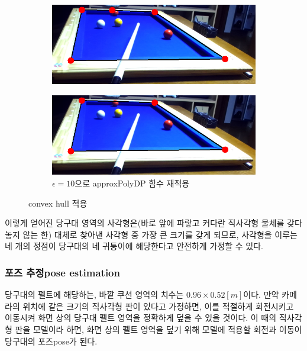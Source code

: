 \documentclass[10pt]{oblivoir}
\newcommand{\textss}[1]{\scriptsize#1\normalsize}
\begin{document}
\begin{figure}[ht]
    \centering
    \begin{subfigure}{8cm}
        \includegraphics[width=\textwidth]{img/billiards-table-low-angle-convex.png}
        \caption{}
        \label{fig;table-lowangle-convexhull-src}
    \end{subfigure}
    \begin{subfigure}{8cm}
        \includegraphics[width=\textwidth]{img/billiards-table-low-angle-convex-aprx.png}
        \caption{$\epsilon=10$으로 approxPolyDP 함수 재적용}
        \label{fig;table-lowangle-convexhull-aprx}
    \end{subfigure}
    \caption{convex hull 적용}
    \label{fig;table-lowangle-convexhull}
\end{figure}

이렇게 얻어진 당구대 영역의 사각형은(바로 앞에 파랗고 커다란 직사각형 물체를 갖다 놓지 않는 한) 대체로 찾아낸 사각형 중 가장 큰 크기를 갖게 되므로, 사각형을 이루는 네 개의 정점이 당구대의 네 귀퉁이에 해당한다고 안전하게 가정할 수 있다.

\subsubsection{포즈 추정\textss{pose estimation}}
당구대의 펠트에 해당하는, 바깥 쿠션 영역의 치수는 $0.96 \times 0.52[m]$이다. 만약 카메라의 위치에 같은 크기의 직사각형 판이 있다고 가정하면, 이를 적절하게 회전시키고 이동시켜 화면 상의 당구대 펠트 영역을 정확하게 덮을 수 있을 것이다. 이 때의 직사각형 판을 모델이라 하면, 화면 상의 펠트 영역을 덮기 위해 모델에 적용할 회전과 이동이 당구대의 포즈\textss{pose}가 된다.
\end{document}
